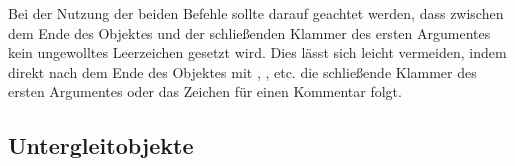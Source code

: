 \documentclass[%
  english,ngerman,%
  cdgeometry=no,DIV=12,%
  cd=false,cdfont=false,cdtitle=true,%
  headings=normal,%
  automark,%
  listof=toc,%
]{tudscrartcl}
\begin{document}
Bei der Nutzung der beiden Befehle sollte darauf geachtet werden, dass zwischen 
dem Ende des Objektes und der schließenden Klammer des ersten Argumentes kein 
ungewolltes Leerzeichen gesetzt wird. Dies lässt sich leicht vermeiden, indem 
direkt nach dem Ende des Objektes mit , 
,  etc. die 
schließende Klammer des ersten Argumentes oder das Zeichen für einen Kommentar 
\PValue{\%} folgt.

\begin{table}
\end{table}



\subsection{%
  Untergleitobjekte%
  \label{sec:subfloats}%
}
\end{document}
